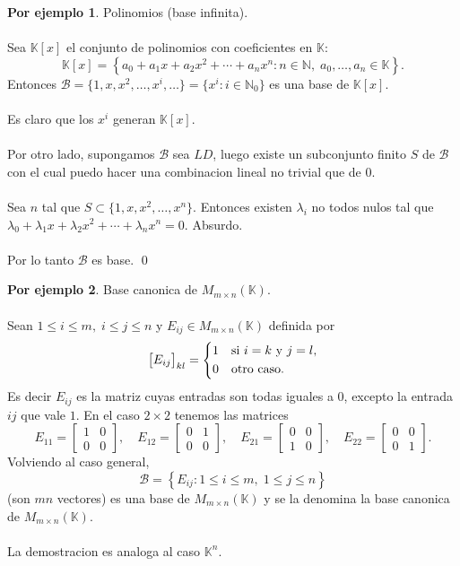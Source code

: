 \documentclass{article}
\theoremstyle{definition}
\theoremstyle{definition}
\newtheorem*{ej}{Por ejemplo}
\theoremstyle{remark}
\begin{document}
\begin{ej}
  Polinomios (base infinita). \\\\ Sea $\mathbb{K}[x]$ el conjunto de polinomios con coeficientes en $\mathbb{K}$: \[
    \mathbb{K}[x]=\left\{a_0+a_1x+a_2x^2+\cdots + a_nx^n : n \in \mathbb{N}, \; a_0,\dots ,a_n \in \mathbb{K}\right\}.
  \]
  Entonces $\mathcal{B}=\{1,x,x^2,\dots ,x^i,\dots \}= \{x^i : i \in \mathbb{N}_0\}$ es una base de $\mathbb{K}[x]$. \\\\ Es claro que los $x^i$ generan $\mathbb{K}[x]$. \\\\ Por otro lado, supongamos $\mathcal{B}$ sea $LD$, luego existe un subconjunto finito $S$ de $\mathcal{B}$ con el cual puedo hacer una combinacion lineal no trivial que de $0$. \\\\ Sea $n$ tal que $S \subset \{1, x, x^2, \dots , x^n \}.$ Entonces existen $\lambda_i$ no todos nulos tal que $\lambda_0+\lambda_1x+\lambda_2 x^2 + \cdots + \lambda_{n}x^{n}=0$. Absurdo. \\\\ Por lo tanto $\mathcal{B}$ es base. \qed 
\end{ej}
\begin{ej}
  Base canonica de $M_{m \times n}(\mathbb{K})$. \\\\ Sean $1 \leq i \leq m, \; i \leq j \leq n$ y $ E_{ij} \in M_{m \times n}(\mathbb{K})$ definida por \[
    \begin{bmatrix}E_{ij}\end{bmatrix}_{kl}=\begin{dcases}
    1 & \text{si }i = k \text{ y } j = l,\\
    0 & \text{otro caso.}
    \end{dcases}
  \]
  Es decir $E_{ij}$ es la matriz cuyas entradas son todas iguales a $0$, excepto la entrada $ij$ que vale $1$. En el caso $2 \times 2$ tenemos las matrices \[
    E_{11}=\begin{bmatrix}1 & 0 \\ 0 & 0 \end{bmatrix},
    \quad E_{12}=\begin{bmatrix}0 & 1 \\ 0 & 0 \end{bmatrix}, \quad E_{21}=\begin{bmatrix}0 & 0 \\ 1 & 0 \end{bmatrix}, \quad E_{22}=\begin{bmatrix} 0 & 0 \\ 0 & 1 \end{bmatrix}.
  \]
  Volviendo al caso general, \[
  \mathcal{B}=\left\{E_{ij} : 1 \leq i \leq m, \; 1 \leq j \leq n\right\}
  \]
  (son $mn$ vectores) es una base de $M_{m \times n}(\mathbb{K})$ y se la denomina la base canonica de $M_{m \times n}(\mathbb{K})$. \\\\ La demostracion es analoga al caso $\mathbb{K}^n$.
\end{ej}
\pagebreak
\end{document}
